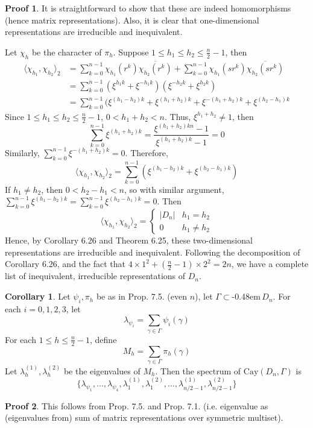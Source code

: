\documentclass{book}
\newcommand{\syin}{$\subset$\kern-0.48em\raisebox{.20ex}{\tiny S}$\,$}
\newcommand{\inner}[1]{\langle #1 \rangle}
\newcommand{\abs}[1]{\lvert #1 \rvert }
\newcommand{\Cay}[1]{\textrm{Cay}( #1 )}
\theoremstyle{definition}
\newtheorem{corollary}[lemma]{Corollary}
\theoremstyle{remarkstyle}
\newtheorem*{myproof}{Proof}%
\begin{document}
\begin{myproof}
    It is straightforward to show that these are indeed homomorphisms (hence matrix representations). Also, it is clear that one-dimensional representations are irreducible and inequivalent. \newline 

    Let $\chi_h$ be the character of $\pi_h$. Suppose $1\le h_1\le h_2\le \frac{n}{2}-1$, then 
    \begin{align*}
        \inner{\chi_{h_1},\chi_{h_2}}_2 
        &= \sum^{n-1}_{k=0}\chi_{h_1}(r^k)\overline{\chi_{h_2}(r^k)} + \sum^{n-1}_{k=0}\chi_{h_1}(sr^k)\overline{\chi_{h_2}(sr^k)} \\
        &= \sum^{n-1}_{k=0}(\xi^{h_1k}+\xi^{-h_1k})(\xi^{-h_2k} + \xi^{h_2k}) \\
        &= \sum^{n-1}_{k=0}(\xi^{(h_1-h_2)k} + \xi^{(h_1+h_2)k} + \xi^{-(h_1+h_2)k} + \xi^{(h_2-h_1)k} 
    \end{align*}
    Since $1\le h_1\le h_2\le \frac{n}{2}-1$, $0<h_1+h_2<n$. Thus, $\xi^{h_1+h_2}\neq 1 $, then 
    $$
    \sum^{n-1}_{k=0}\xi^{(h_1+h_2)k} = \frac{\xi^{(h_1+h_2)kn}-1}{\xi^{(h_1+h_2)k}-1} = 0
    $$
    Similarly, $\sum^{n-1}_{k=0}\xi^{-(h_1+h_2)k}=0$. Therefore, 
    $$
    \inner{\chi_{h_1},\chi_{h_2}}_2 = \sum^{n-1}_{k=0}(\xi^{(h_1-h_2)k} + \xi^{(h_2-h_1)k})
    $$
    If $h_1\neq h_2$, then $0<h_2-h_1<n$, so with similar argument, $\sum^{n-1}_{k=0}\xi^{(h_1-h_2)k}=\sum^{n-1}_{k=0}\xi^{(h_2-h_1)k}=0$. Then 
    $$
    \inner{\chi_{h_1},\chi_{h_2}}_2 = \left\{
    \begin{array}{ll}
        \abs{D_n} & h_1=h_2 \\
        0 & h_1\neq h_2 
    \end{array}
    \right.
    $$
    Hence, by Corollary 6.26 and Theorem 6.25, these two-dimensional representations are irreducible and inequivalent. Following the decomposition of Corollary 6.26, and the fact that $4\times 1^2 + (\frac{n}{2}-1)\times 2^2 = 2n$, we have a complete list of inequivalent, irreducible representations of $D_n$. \newline
\end{myproof}

\begin{corollary}
    Let $\psi_i,\pi_h$ be as in Prop. 7.5. (even $n$), let $\Gamma$\syin$D_n$. For each $i=0,1,2,3$, let 
    $$
    \lambda_{\psi_i} = \sum_{\gamma\in\Gamma}\psi_i(\gamma)
    $$
    For each $1\le h\le \frac{n}{2}-1$, define 
    $$
    M_h = \sum_{\gamma\in\Gamma}\pi_h(\gamma)
    $$
    Let $\lambda_h^{(1)}, \lambda_h^{(2)} $ be the eigenvalues of $M_h$. Then the spectrum of $\Cay{D_n,\Gamma}$ is 
    $$
    \{\lambda_{\psi_1}, \dots, \lambda_{\psi_4}, \lambda_1^{(1)},\lambda_1^{(2)}, \dots, \lambda_{n/2-1}^{(1)}, \lambda_{n/2-1}^{(2)} \}
    $$
\end{corollary}
\begin{myproof}
    This follows from Prop. 7.5. and Prop. 7.1. (i.e. eigenvalue as (eigenvalues from) sum of matrix representations over symmetric multiset).\newline
\end{myproof}
\end{document}
